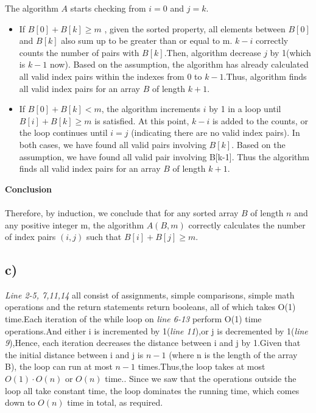 \documentclass[12pt]{article}
\begin{document}
The algorithm $A$ starts checking from $i = 0$ and $j = k$.
\begin{itemize}
    \item If $B[0] + B[k] \geq m$ , given the sorted property,  all elements 
    between $B[0]$ and $B[k]$ also sum up to be greater than or equal to m. $k-i$ correctly counts the number of pairs
    with $B[k]$.Then, algorithm decrease $j$ by 1(which is $k-1$ now).
    Based on the assumption, the algorithm has already calculated all 
    valid index pairs within the indexes from $0$ to $k-1$.Thus, algorithm finds all 
    valid index pairs for an array $B$ of length $k+1$.

    \item If $B[0] + B[k] < m$, the algorithm increments \(i\) 
    by 1 in a loop until \(B[i] + B[k] \geq m\) is satisfied. 
    At this point, \(k-i\) is added to the counts, or the loop continues 
    until \(i = j\) (indicating there are no valid index pairs). In both 
    cases, we have found all valid pairs involving $B[k]$. Based 
    on the assumption, we have found all valid pair involving B[k-1].
    Thus the algorithm finds all valid index pairs for an 
    array $B$ of length $k+1$.
    

    \end{itemize}
\textbf{Conclusion}\\\\
Therefore, by induction, we conclude that for any sorted array $B$ of 
length $n$ and any positive integer m, the algorithm $A(B, m)$ correctly 
calculates the number of index pairs $(i, j)$ such that $B[i] + B[j] 
\geq m$.

\subsection*{c)}

\textit{Line 2-5, 7,11,14} all consist of assignments, simple comparisons, 
simple math operations and the return statements return booleans, all 
of which takes O(1) time.Each iteration of the while loop on 
\textit{line 6-13} perform O(1) time operations.And either i is incremented 
by 1(\textit{line 11}),or j is decremented by 1(\textit{line 9}),Hence, 
each iteration decreases the distance between i and j by 1.Given that 
the initial distance between i and j is $n - 1$ (where n is the length 
of the array B), the loop can run at most $n - 1$ times.Thus,the loop takes 
at most $O(1) \cdot O(n)$ or $O(n)$ time.. Since we saw that the operations 
outside the loop all take constant time, the loop dominates the running 
time, which comes down to $O(n)$ time in total, as required.
\end{document}
